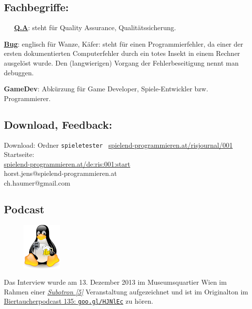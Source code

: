\subsection*{Fachbegriffe:}
~~~\href{https://de.wikipedia.org/wiki/Quality_Assurance}{\textbf{Q.A}}: steht für Quality Assurance,  Qualitätssicherung.

\href{https://de.wikipedia.org/wiki/Programmfehler}{\textbf{Bug}}: englisch für Wanze, Käfer: steht für einen Programmierfehler, da einer der ersten dokumentierten Computerfehler durch ein totes Insekt in einem Rechner ausgelöst wurde. Den (langwierigen) Vorgang der Fehlerbeseitigung nennt man debuggen.
 
\textbf{GameDev}: Abkürzung für Game Developer, Spiele-Entwickler bzw. Programmierer.

\subsection*{Download, Feedback:}
\footnotesize{
Download: Ordner \texttt{spieletester} \Mundus\ \href{http://spielend-programmieren.at/risjournal/001}{spielend-programmieren.at/risjournal/001}\\
Startseite:\\
\href{http://spielend-programmieren.at/de:ris:001:start}{spielend-programmieren.at/de:ris:001:start}\\ 
\Letter\: horst.jens@spielend-programmieren.at\\
\Letter\: ch.haumer@gmail.com\\}
\normalsize 

\subsection*{Podcast}
\begin{figure}
\includegraphics[width=2cm]{nomad/biertaucherlogo.png}
\end{figure}
Das Interview wurde am 13. Dezember 2013 im Museumsquartier Wien im Rahmen einer \href{http://subotron.com/}{\textit{Subotron [5]}} Veranstaltung aufgezeichnet und ist im Originalton im \href{http://spielend-programmieren.at/de:podcast:biertaucher:2013:135}{Biertaucherpodcast 135: \texttt{goo.gl/HJNlEc}} zu hören.

